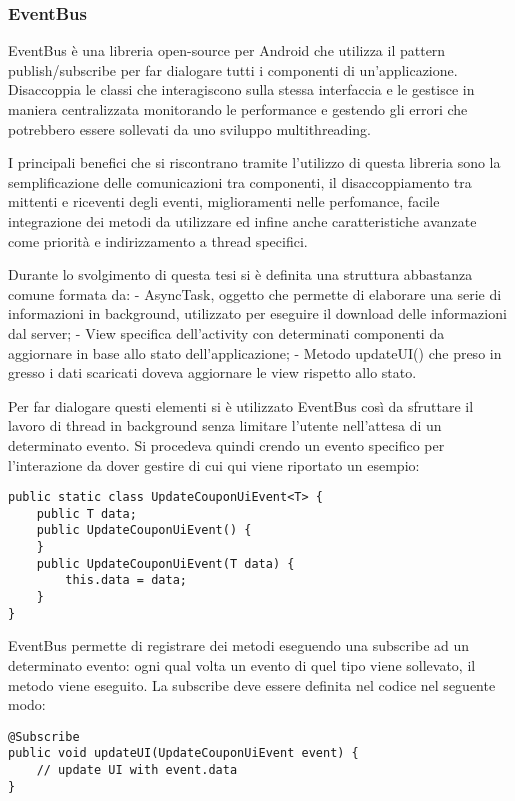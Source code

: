 \subsubsection{EventBus}
EventBus è una libreria open-source per Android che utilizza il pattern publish/subscribe per far dialogare tutti i componenti di un'applicazione.
Disaccoppia le classi che interagiscono sulla stessa interfaccia e le gestisce in maniera centralizzata monitorando le performance e gestendo gli errori che potrebbero essere sollevati da uno sviluppo multithreading.\autocite{GREENROBOT:EVENTBUS}

I principali benefici che si riscontrano tramite l'utilizzo di questa libreria sono la semplificazione delle comunicazioni tra componenti, il disaccoppiamento tra mittenti e riceventi degli eventi, miglioramenti nelle perfomance, facile integrazione dei metodi da utilizzare ed infine anche caratteristiche avanzate come priorità e indirizzamento a thread specifici.

Durante lo svolgimento di questa tesi si è definita una struttura abbastanza comune formata da:
- AsyncTask, oggetto che permette di elaborare una serie di informazioni in background, utilizzato per eseguire il download delle informazioni dal server;
- View specifica dell'activity con determinati componenti da aggiornare in base allo stato dell'applicazione;
- Metodo updateUI() che preso in gresso i dati scaricati doveva aggiornare le view rispetto allo stato.

Per far dialogare questi elementi si è utilizzato EventBus così da sfruttare il lavoro di thread in background senza limitare l'utente nell'attesa di un determinato evento.
Si procedeva quindi crendo un evento specifico per l'interazione da dover gestire di cui qui viene riportato un esempio:

\begin{lstlisting}
public static class UpdateCouponUiEvent<T> {
	public T data;
	public UpdateCouponUiEvent() {
	}
	public UpdateCouponUiEvent(T data) {
		this.data = data;
	}
}
\end{lstlisting}

EventBus permette di registrare dei metodi eseguendo una subscribe ad un determinato evento: ogni qual volta un evento di quel tipo viene sollevato, il metodo viene eseguito.
La subscribe deve essere definita nel codice nel seguente modo:

\begin{lstlisting}
@Subscribe
public void updateUI(UpdateCouponUiEvent event) {
	// update UI with event.data
}
\end{lstlisting}

